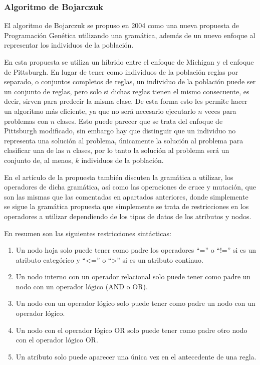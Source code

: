 \newpage

\subsubsection{Algoritmo de Bojarczuk}


El algoritmo de Bojarczuk \cite{algoritmoBojarczuk} se propuso en 2004 como una nueva propuesta de Programación Genética utilizando una gramática, además de un nuevo enfoque al representar los individuos de la población.

En esta propuesta se utiliza un híbrido entre el enfoque de Michigan y el enfoque de Pittsburgh. En lugar de tener como individuos de la población reglas por separado, o conjuntos completos de reglas, un individuo de la población puede ser un conjunto de reglas, pero solo si dichas reglas tienen el mismo consecuente, es decir, sirven para predecir la misma clase. De esta forma esto les permite hacer un algoritmo más eficiente, ya que no será necesario ejecutarlo $n$ veces para problemas con $n$ clases. Esto puede parecer que se trata del enfoque de Pittsburgh modificado, sin embargo hay que distinguir que un individuo no representa una solución al problema, únicamente la solución al problema para clasificar una de las $n$ clases, por lo tanto la solución al problema será un conjunto de, al menos, $k$ individuos de la población.

En el artículo de la propuesta también discuten la gramática a utilizar, los operadores de dicha gramática, así como las operaciones de cruce y mutación, que son las mismas que las comentadas en apartados anteriores, donde simplemente se sigue la gramática propuesta que simplemente se trata de restricciones en los operadores a utilizar dependiendo de los tipos de datos de los atributos y nodos.

En resumen son las siguientes restricciones sintácticas:

\begin{enumerate}
	\item Un nodo hoja solo puede tener como padre los operadores ``='' o ``!='' si es un atributo categórico y ``<='' o ``>'' si es un atributo continuo.
	\item Un nodo interno con un operador relacional solo puede tener como padre un nodo con un operador lógico (AND o OR).
	\item Un nodo con un operador lógico solo puede tener como padre un nodo con un operador lógico.
	\item Un nodo con el operador lógico OR solo puede tener como padre otro nodo con el operador lógico OR.
	\item Un atributo solo puede aparecer una única vez en el antecedente de una regla.
\end{enumerate}

